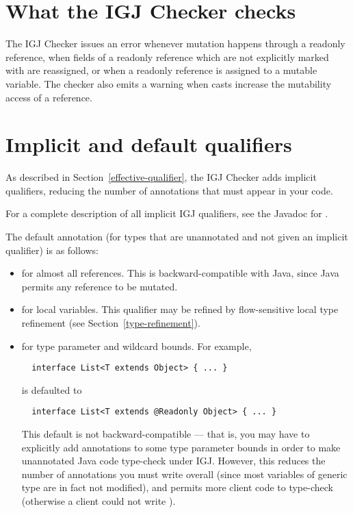 \section{What the IGJ Checker checks\label{igj-checks}}

The IGJ Checker issues an error whenever mutation happens through a
readonly reference, when fields of a readonly reference which are not
explicitly marked with  are
reassigned, or when a readonly reference is assigned to a mutable
variable.  The checker also emits a warning when casts increase the
mutability access of a reference.



\section{Implicit and default qualifiers\label{igj-implicit-qualifiers}}

As described in Section~\ref{effective-qualifier}, the IGJ Checker
adds implicit qualifiers, reducing the number of annotations that must
appear in your code.

For a complete description of all implicit IGJ qualifiers, see the
Javadoc for .

The default annotation (for types that are unannotated and not given an
implicit qualifier) is as follows:
\begin{itemize}
\item
   for almost all references.  This is backward-compatible
  with Java, since Java permits any reference to be mutated.
\item
   for local variables.  This qualifier may be refined by
  flow-sensitive local type refinement (see Section~\ref{type-refinement}).
\item
   for type parameter and wildcard bounds.  For example,

\begin{Verbatim}
  interface List<T extends Object> { ... }
\end{Verbatim}

\noindent
is defaulted to

\begin{Verbatim}
  interface List<T extends @Readonly Object> { ... }
\end{Verbatim}

This default is not backward-compatible --- that is, you may have to
explicitly add  annotations to some type parameter bounds in
order to make unannotated Java code type-check under IGJ\@.  However, this
reduces the number of annotations you must write overall (since most
variables of generic type are in fact not modified), and permits more
client code to type-check (otherwise a client could not write
).

\end{itemize}



